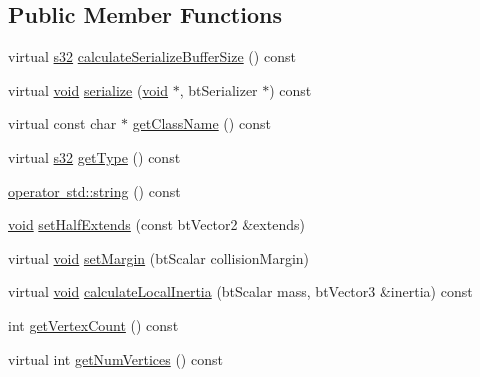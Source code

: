 \subsection*{Public Member Functions}
\begin{DoxyCompactItemize}
\item 
virtual \mbox{\hyperlink{_util_8h_aa62c75d314a0d1f37f79c4b73b2292e2}{s32}} \mbox{\hyperlink{classnjli_1_1_physics_shape_box2_d_a14716c113a5f559ffde6051a018bb7a2}{calculate\+Serialize\+Buffer\+Size}} () const
\item 
virtual \mbox{\hyperlink{_thread_8h_af1e856da2e658414cb2456cb6f7ebc66}{void}} \mbox{\hyperlink{classnjli_1_1_physics_shape_box2_d_ad3f806a86d7db579cd7d43f4e8f41ace}{serialize}} (\mbox{\hyperlink{_thread_8h_af1e856da2e658414cb2456cb6f7ebc66}{void}} $\ast$, bt\+Serializer $\ast$) const
\item 
virtual const char $\ast$ \mbox{\hyperlink{classnjli_1_1_physics_shape_box2_d_a176b8cfb4df192e48295adc6e97a1e8d}{get\+Class\+Name}} () const
\item 
virtual \mbox{\hyperlink{_util_8h_aa62c75d314a0d1f37f79c4b73b2292e2}{s32}} \mbox{\hyperlink{classnjli_1_1_physics_shape_box2_d_a1fd8c07d99fd3cbd64a94c3030c0d5d5}{get\+Type}} () const
\item 
\mbox{\hyperlink{classnjli_1_1_physics_shape_box2_d_a66e77cf7de8db55806fd760ff66591b0}{operator std\+::string}} () const
\item 
\mbox{\hyperlink{_thread_8h_af1e856da2e658414cb2456cb6f7ebc66}{void}} \mbox{\hyperlink{classnjli_1_1_physics_shape_box2_d_aabb6127836224df169241021262fd609}{set\+Half\+Extends}} (const bt\+Vector2 \&extends)
\item 
virtual \mbox{\hyperlink{_thread_8h_af1e856da2e658414cb2456cb6f7ebc66}{void}} \mbox{\hyperlink{classnjli_1_1_physics_shape_box2_d_afe01bb58b54161763a144b4560161265}{set\+Margin}} (bt\+Scalar collision\+Margin)
\item 
virtual \mbox{\hyperlink{_thread_8h_af1e856da2e658414cb2456cb6f7ebc66}{void}} \mbox{\hyperlink{classnjli_1_1_physics_shape_box2_d_a361328cd84db13fa37ae62b727e94596}{calculate\+Local\+Inertia}} (bt\+Scalar mass, bt\+Vector3 \&inertia) const
\item 
int \mbox{\hyperlink{classnjli_1_1_physics_shape_box2_d_a14448749c7d6f84beff490ca12acbd6f}{get\+Vertex\+Count}} () const
\item 
virtual int \mbox{\hyperlink{classnjli_1_1_physics_shape_box2_d_ab6b86970a80827d5ea8620dbb080023f}{get\+Num\+Vertices}} () const
\item 

\end{DoxyCompactItemize}
